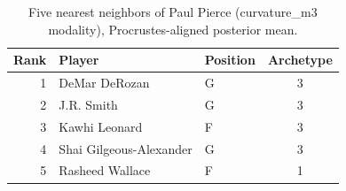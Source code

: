 \begin{table}[htbp]
  \centering\small
  \begin{tabular}{rllc}
    \toprule
    Rank & Player & Position & Archetype \\
    \midrule
    1 & DeMar DeRozan & G & 3 \\
    2 & J.R. Smith & G & 3 \\
    3 & Kawhi Leonard & F & 3 \\
    4 & Shai Gilgeous-Alexander & G & 3 \\
    5 & Rasheed Wallace & F & 1 \\
    \bottomrule
  \end{tabular}
  \caption{Five nearest neighbors of Paul Pierce (curvature_m3 modality), Procrustes-aligned posterior mean.}
  \label{tab:Paul_Pierce_neighbors_curvature_m3}
\end{table}

